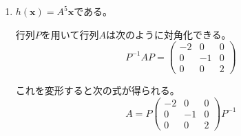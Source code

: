 \documentclass[12pt,b5paper]{ltjsarticle}
\begin{document}
\begin{description}
\begin{enumerate}
        \item
             $h(\bm{x})=A^{5}\bm{x}$である。

             行列$P$を用いて行列$A$は次のように対角化できる。
             \begin{equation}
              P^{-1}AP =
               \begin{pmatrix}
                -2 & 0 & 0 \\
                0 & -1 & 0 \\
                0 & 0 & 2
               \end{pmatrix}
             \end{equation}

             これを変形すると次の式が得られる。
             \begin{equation}
              A= P
               \begin{pmatrix}
                -2 & 0 & 0 \\
                0 & -1 & 0 \\
                0 & 0 & 2
               \end{pmatrix}
               P^{-1}
             \end{equation}


\end{enumerate}
\end{description}
\end{document}
